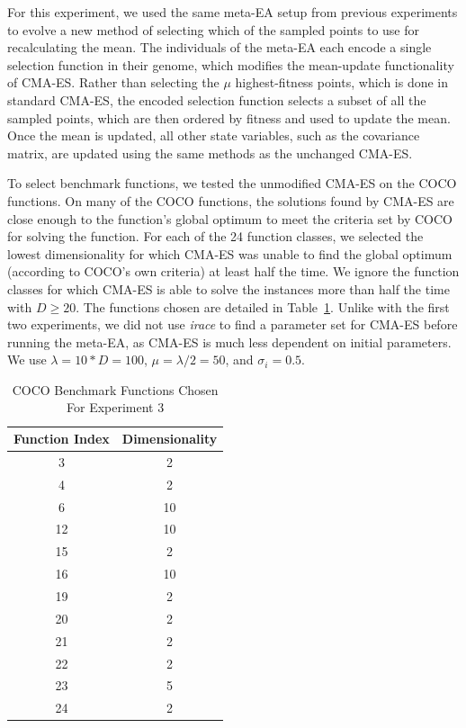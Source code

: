 \documentclass[sigconf]{acmart}
\begin{document}
For this experiment, we used the same meta-EA setup from previous experiments to evolve a new method of selecting which of the sampled points to use for recalculating the mean. The individuals of the meta-EA each encode a single selection function in their genome, which modifies the mean-update functionality of CMA-ES. Rather than selecting the $\mu$ highest-fitness points, which is done in standard CMA-ES, the encoded selection function selects a subset of all the sampled points, which are then ordered by fitness and used to update the mean. Once the mean is updated, all other state variables, such as the covariance matrix, are updated using the same methods as the unchanged CMA-ES.

To select benchmark functions, we tested the unmodified CMA-ES on the COCO functions. On many of the COCO functions, the solutions found by CMA-ES are close enough to the function's global optimum to meet the criteria set by COCO for solving the function. For each of the 24 function classes, we selected the lowest dimensionality for which CMA-ES was unable to find the global optimum (according to COCO's own criteria) at least half the time. We ignore the function classes for which CMA-ES is able to solve the instances more than half the time with $D\geq20$. The functions chosen are detailed in Table~\ref{tab:experiment3chosenFunctions}. Unlike with the first two experiments, we did not use \textit{irace} to find a parameter set for CMA-ES before running the meta-EA, as CMA-ES is much less dependent on initial parameters. We use $\lambda=10*D=100$, $\mu = \lambda/2 = 50$, and $\sigma_i = 0.5$. 

\begin{table}
	\centering
	\caption{COCO Benchmark Functions Chosen For Experiment 3}
	\label{tab:experiment3chosenFunctions}
	\begin{tabular}{c|c}
		\toprule
		Function Index & Dimensionality \\
		\midrule
		3 & 2\\
		\hline
		4& 2\\
		\hline
		6& 10\\
		\hline
		12& 10\\
		\hline
		15& 2\\
		\hline
		16& 10\\
		\hline
		19& 2\\
		\hline
		20& 2\\
		\hline
		21& 2\\
		\hline
		22& 2\\
		\hline
		23& 5\\
		\hline
		24& 2\\                        
		
		\bottomrule
	\end{tabular}
\end{table}
\end{document}
